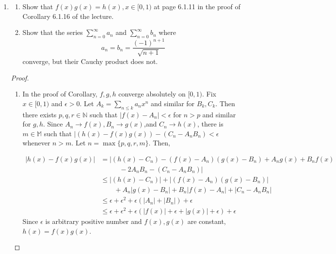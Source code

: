 \documentclass{article}
\begin{document}
\begin{enumerate}[font = \Large\bfseries\itshape\space, leftmargin = 3mm, labelsep = 3mm]
\begin{proof}
\begin{enumerate}[label = (\roman*)]
\end{enumerate}
\end{proof}

\item
\begin{enumerate}[label=(\roman*)]
\item
Show that $f(x)g(x) = h(x), x \in [0,1)$ at page 6.1.11 in the proof of Corollary 6.1.16 of the lecture.

\item
Show that the series $\sum_{n=0}^\infty a_n$ and $\sum_{n=0}^\infty b_n$ where
$$a_n = b_n = \frac{(-1)^{n+1}}{\sqrt{n+1}}$$
converge, but their Cauchy product does not.
\end{enumerate}

\begin{proof}
\begin{enumerate}[wide, label=(\roman*)]
\item In the proof of Corollary, $f, g, h$ converge absolutely on $[0,1)$.
Fix $x \in [0,1)$ and $\epsilon > 0$.
Let $A_k = \sum_{n \leq k} a_nx^n$ and similar for $B_k, C_k$.
Then there exists $p, q, r \in \mathbb{N}$ such that $|f(x) - A_n| < \epsilon$ for $n > p$ and similar for $g, h$.
Since $A_n \rightarrow f(x), B_n \rightarrow g(x)$,and $C_n \rightarrow h(x)$, there is $m \in \mathbb{M}$ such that
$| (h(x) - f(x)g(x)) - (C_n - A_nB_n) < \epsilon $ whenever $n > m$.
Let $n = \max\{p,q,r,m\}$.
Then,

$$
\begin{aligned}
\left|h(x) - f(x)g(x)\right|
&= |(h(x) - C_n) - (f(x)-A_n)(g(x)-B_n) + A_n g(x) + B_nf(x)
\\ &\phantom{---} - 2A_nB_n - (C_n - A_nB_n)|\\
&\leq \left|(h(x) - C_n)\right| + \left|(f(x)-A_n)(g(x)-B_n)\right| \\ &\phantom{--}+ A_n\left| g(x) - B_n \right| + B_n\left|f(x) - A_n\right| + |C_n - A_nB_n|\\
&\leq \epsilon + \epsilon^2 + \epsilon (|A_n| + |B_n|) + \epsilon\\
&\leq \epsilon + \epsilon^2 + \epsilon(|f(x)| + \epsilon + |g(x)| + \epsilon) + \epsilon
\end{aligned}
$$
Since $\epsilon$ is arbitrary positive number and $f(x), g(x)$ are constant, $h(x) = f(x)g(x)$.


\end{enumerate}
\end{proof}
\end{enumerate}
\end{document}

